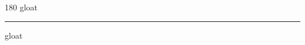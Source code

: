 
\begin{frame}
\begin{center}
\begin{turn}{180}
{\fontsize{2.5cm}{1em}\selectfont gloat}
\end{turn}
\vspace{1em}\par  
\hrule
\vspace{1em}\par  
{\fontsize{2.5cm}{1em}\selectfont gloat}
\end{center}
\end{frame}
